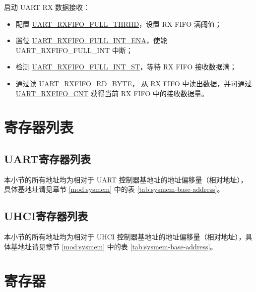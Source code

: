 \documentclass[main\_\_CN.tex]{subfiles}
\begin{document}
启动 UART RX 数据接收：
\begin{itemize}
    \item 配置 \hyperref[fielddesc:UARTRXFIFOFULLTHRHD]{UART\_RXFIFO\_FULL\_THRHD}，设置 RX FIFO 满阈值；
    \item 置位 \hyperref[fielddesc:UARTRXFIFOFULLINTENA]{UART\_RXFIFO\_FULL\_INT\_ENA}，使能 UART\_RXFIFO\_FULL\_INT 中断；
    \item 检测 \hyperref[fielddesc:UARTRXFIFOFULLINTST]{UART\_RXFIFO\_FULL\_INT\_ST}，等待 RX FIFO 接收数据满；
    \item 通过读 \hyperref[fielddesc:UARTRXFIFORDBYTE]{UART\_RXFIFO\_RD\_BYTE}， 从 RX FIFO 中读出数据，并可通过 \hyperref[fielddesc:UARTRXFIFOCNT]{UART\_RXFIFO\_CNT} 获得当前 RX FIFO 中的接收数据量。
\end{itemize}



\clearpage
\section{寄存器列表}
\label{sec:uart-reg-summ}
\hypertarget{uart-reg-summ}{}

\subsection{UART寄存器列表}

本小节的所有地址均为相对于 UART 控制器基地址的地址偏移量（相对地址），具体基地址请见章节 \ref{mod:sysmem} \textit{} 中的表 \ref{tab:sysmem-base-address}。




\subsection{UHCI寄存器列表}

本小节的所有地址均为相对于 UHCI 控制器基地址的地址偏移量（相对地址），具体基地址请见章节 \ref{mod:sysmem} \textit{} 中的表 \ref{tab:sysmem-base-address}。






\clearpage
\section{寄存器}
\end{document}
